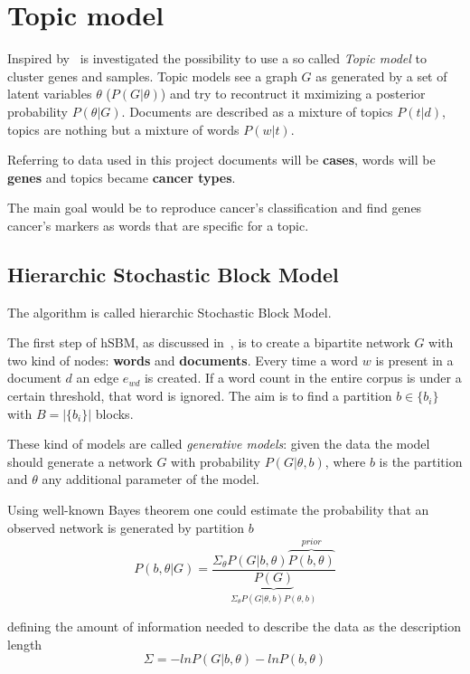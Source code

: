 \chapter{Topic model}\label{ch:topicmodelling}
Inspired by~\cite{gerlach2018network} is investigated the possibility to use a so called \textit{Topic model} to cluster genes and samples.
Topic models see a graph $G$ as generated by a set of latent
variables $\theta$ ($P(G|\theta)$) and try to recontruct it mximizing a posterior probability $P(\theta|G)$.
Documents are described as a mixture of topics $P(t|d)$, topics are nothing but
a mixture of words $P(w|t)$.

Referring to data used in this project documents will be \textbf{cases}, words will be \textbf{genes} and topics became
\textbf{cancer types}.

The main goal would be to reproduce cancer's classification and find genes
cancer's markers as words that are specific for a topic.


\section{Hierarchic Stochastic Block Model}
The algorithm is called hierarchic Stochastic Block Model.

The first step of hSBM, as discussed in~\cite{peixoto2014efficient},
is to create a bipartite network $G$ with two kind of nodes: \textbf{words} and \textbf{documents}.
Every time a word $w$ is present in a document $d$ an edge $e_{wd}$ is created.
If a word count in the entire corpus is under a certain threshold, that word is ignored.
The aim is to find a partition $b\in\{b_i\}$ with $B=\left|\{b_i\}\right|$ blocks.

These kind of models are called \textit{generative models}: given the data the model
should generate a network $G$ with probability $P(G|\theta, b)$, where $b$ is
the partition and $\theta$ any additional parameter of the model.

Using well-known Bayes theorem one could estimate the probability that an
observed network is generated by partition $b$
\begin{equation}\label{eq:PbonG}
  P(b,\theta|G)=\frac{\Sigma_{\theta}P(G|b,\theta)\overbrace{P(b,\theta)}^{prior}}{\underbrace{P(G)}_{\Sigma_{\theta}P(G|\theta, b)P(\theta, b)}}
\end{equation}

defining the amount of information needed to describe the data as the description length
\begin{equation}\label{eq:descriptionlenght}
  \Sigma=-lnP(G|b,\theta)-lnP(b, \theta)
\end{equation}

